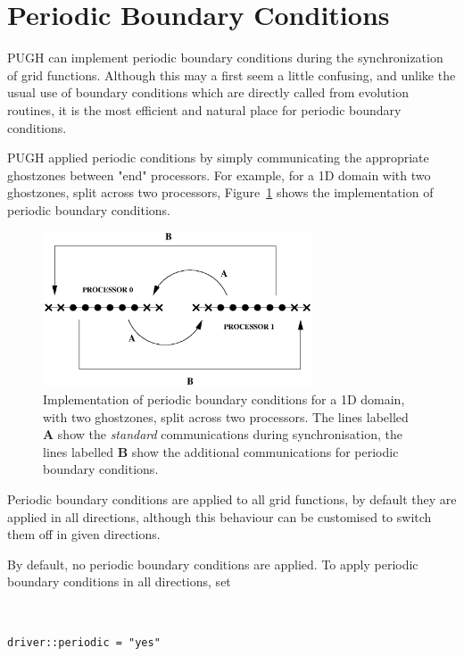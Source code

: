 \documentclass{article}
\newif\ifpdf
\begin{document}
\section{Periodic Boundary Conditions}

PUGH can implement periodic boundary conditions during the synchronization 
of grid functions. Although this may a first seem a little confusing, and 
unlike the usual use of boundary conditions which are directly called from 
evolution routines, it is the most efficient and natural place for periodic
boundary conditions.

PUGH applied periodic conditions by simply communicating the appropriate 
ghostzones between "end" processors. For example, for a 1D domain with two
ghostzones, split across two processors, Figure~\ref{pugh::fig1} shows the implementation of periodic boundary conditions.

\begin{figure}[ht]
\begin{center}
\ifpdf
\else
\includegraphics[angle=0,width=8cm]{periodic.eps}
\fi
\end{center}
\caption[]{Implementation of periodic boundary conditions for a 1D domain, with two ghostzones, split across two processors. The lines labelled {\bf A} show the {\it standard} communications during synchronisation, the lines labelled 
{\bf B} show the additional communications for periodic boundary conditions.} 
\label{pugh::fig1}
\end{figure}

Periodic boundary conditions are applied to all grid functions, by default
they are applied in all directions, although this behaviour can be customised
to switch them off in given directions.

By default, no periodic boundary conditions are applied. To apply periodic boundary conditions in all directions, set

{\tt
\begin{verbatim}
driver::periodic = "yes"
\end{verbatim}
}
\end{document}
